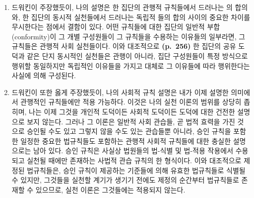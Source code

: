 \begin{enumerate}
\def\labelenumi{(\roman{enumi})}
\item
  드워킨이 주장했듯이, 나의 설명은 한 집단의 관행적 규칙들에서 드러나는
  의 합의와, 한 집단의 동시적 실천들에서 드러나는
  독립적 들의 합의 사이의 중요한 차이를
  무시한다는 점에서 결함이 있다. 어떤 규칙들에 대한 집단의 일반적
  부합(conformity)이 그 개별 구성원들이 그 규칙들을 수용하는 이유들의
  일부라면, 그 규칙들은 관행적 사회 실천들이다. 이와 대조적으로
  \textbf{(p.~256)} 한 집단의 공유 도덕과 같은 단지 동시적인 실천들은
  관행이 아니라, 집단 구성원들이 특정 방식으로 행위할 동일하지만
  독립적인 이유들을 가지고 대체로 그 이유들에 따라 행위한다는 사실에
  의해 구성된다.
\item
  드워킨이 또한 옳게 주장했듯이, 나의 사회적 규칙 설명은 내가 이제
  설명한 의미에서 관행적인 규칙들에만 적용 가능하다. 이것은 나의 실천
  이론의 범위를 상당히 좁히며, 나는 이제 그것을 개인적 도덕이든 사회적
  도덕이든 도덕에 대한 건전한 설명으로 보지 않는다. 그러나 그 이론은
  일반적 사회 관습들, 곧 법적 효력을 가진 것으로 승인될 수도 있고 그렇지
  않을 수도 있는 관습들뿐 아니라, 승인 규칙을 포함한 일정한 중요한
  법규칙들도 포함하는 관행적 사회적 규칙들에 대한 충실한 설명으로는 남아
  있다. 승인 규칙은 사실상 법원들의 법-식별 및 법-적용 작용에서 수용되고
  실천될 때에만 존재하는 사법적 관습 규칙의 한 형식이다. 이와 대조적으로
  제정된 법규칙들은, 승인 규칙이 제공하는 기준들에 의해 유효한
  법규칙들로 식별될 수 있지만, 그것들을 실천할 계기가 생기기 전에도
  제정의 순간부터 법규칙들로 존재할 수 있으므로, 실천 이론은 그것들에는
  적용되지 않는다.
\end{enumerate}


